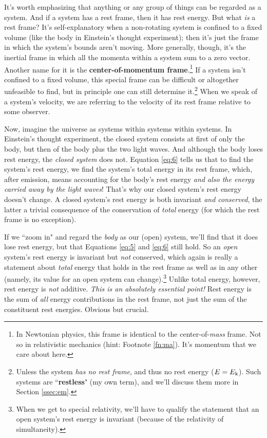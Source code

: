 \documentclass[12pt]{article}
\begin{document}
It's worth emphasizing that anything or any group of things can be regarded as a system. And if a system has a rest frame, then it has rest energy. But what \emph{is} a rest frame? It's self-explanatory when a non-rotating system is confined to a fixed volume (like the body in Einstein's thought experiment); then it's just the frame in which the system's bounds aren't moving. More generally, though, it's the inertial frame in which all the momenta within a system sum to a zero vector. Another name for it is the \textbf{center-of-momentum frame}.\footnote{In Newtonian physics, this frame is identical to the center-of-\emph{mass} frame. Not so in relativistic mechanics (hint: Footnote \ref{fn:ma}). It's momentum that we care about here.} If a system isn't confined to a fixed volume, this special frame can be difficult or altogether unfeasible to find, but in principle one can still determine it.\footnote{\label{fn:rl}Unless the system \emph{has no rest frame}, and thus no rest energy ($E = E_{\mkern.5mu \textrm{k}}$). Such systems are ``\textbf{restless}" (my own term), and we'll discuss them more in Section \ref{ssec:em}.} When we speak of a system's velocity, we are referring to the velocity of its rest frame relative to some observer.

Now, imagine the universe as systems within systems within systems. In Einstein's thought experiment, the closed system consists at first of only the body, but then of the body plus the two light waves. And although the body loses rest energy, the \emph{closed system} does not. Equation \ref{eq:6} tells us that to find the system's rest energy, we find the system's total energy in its rest frame, which, after emission, means accounting for the body's rest energy \emph{and also the energy carried away by the light waves}! That's why our closed system's rest energy doesn't change. A closed system's rest energy is both invariant \emph{and conserved}, the latter a trivial consequence of the conservation of \emph{total} energy (for which the rest frame is no exception).

If we ``zoom in" and regard the \emph{body} as our (open) system, we'll find that it does lose rest energy, but that Equations \ref{eq:5} and \ref{eq:6} still hold. So an \emph{open} system's rest energy is invariant but \emph{not} conserved, which again is really a statement about \emph{total} energy that holds in the rest frame as well as in any other (namely, its value for an open system can change).\footnote{When we get to special relativity, we'll have to qualify the statement that an open system's rest energy is invariant (because of the relativity of simultaneity).} Unlike total energy, however, rest energy is \emph{not} additive. \emph{This is an absolutely essential point!} Rest energy is the sum of \emph{all} energy contributions in the rest frame, not just the sum of the constituent rest energies. Obvious but crucial.
\end{document}
